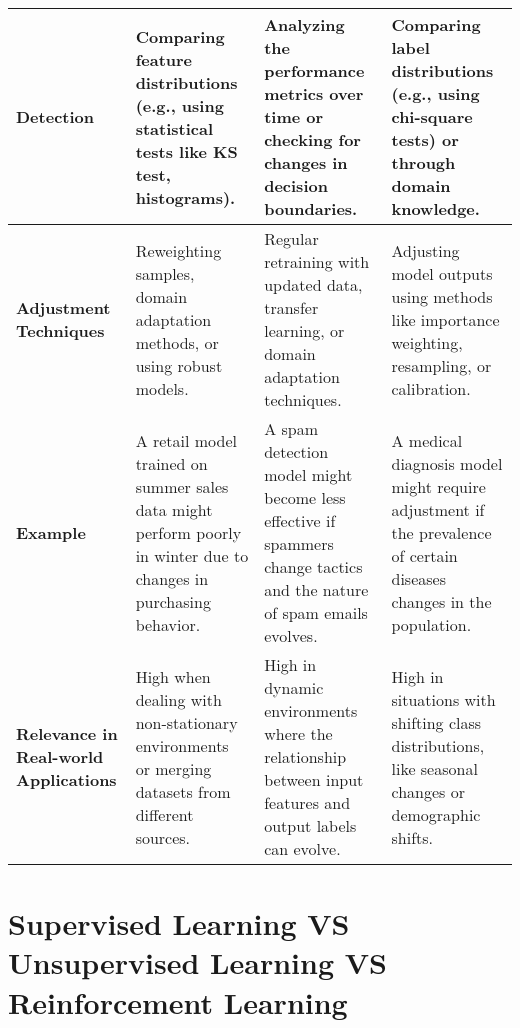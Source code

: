 \begin{alternateColorTable}
\begin{longtable}{|m{2cm}|m{4.5cm}|m{4.5cm}|m{4.5cm}|}
    \textbf{Detection} & Comparing feature distributions (e.g., using statistical tests like KS test, histograms). & Analyzing the performance metrics over time or checking for changes in decision boundaries. & Comparing label distributions (e.g., using chi-square tests) or through domain knowledge. \\ \hline

    \textbf{Adjustment Techniques} & Reweighting samples, domain adaptation methods, or using robust models. & Regular retraining with updated data, transfer learning, or domain adaptation techniques. & Adjusting model outputs using methods like importance weighting, resampling, or calibration. \\ \hline

    \textbf{Example} & A retail model trained on summer sales data might perform poorly in winter due to changes in purchasing behavior. & A spam detection model might become less effective if spammers change tactics and the nature of spam emails evolves. & A medical diagnosis model might require adjustment if the prevalence of certain diseases changes in the population. \\ \hline

    \textbf{Relevance in Real-world Applications} & High when dealing with non-stationary environments or merging datasets from different sources. & High in dynamic environments where the relationship between input features and output labels can evolve. & High in situations with shifting class distributions, like seasonal changes or demographic shifts. \\ \hline

\end{longtable}
\end{alternateColorTable}


\section{Supervised Learning VS Unsupervised Learning VS Reinforcement Learning \cite{chatgpt,medium-numsmt2-rl-ch1-part-1}}\label{Supervised Learning VS Unsupervised Learning VS Reinforcement Learning}

